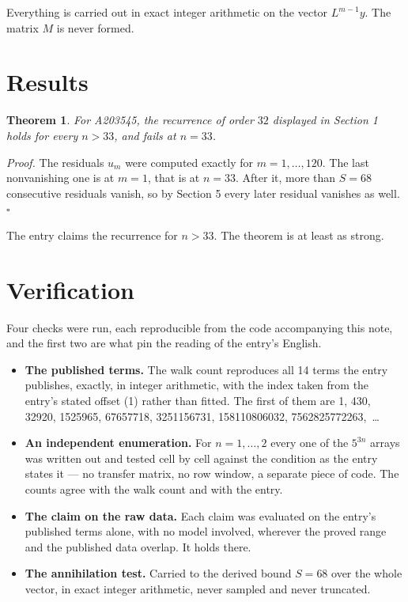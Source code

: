 \documentclass[11pt]{article}
\newtheorem{theorem}{Theorem}
\theoremstyle{definition}
\begin{document}
Everything is carried out in exact integer arithmetic on the vector $L^{m-1}y$. The matrix $M$ is never formed.

\section{Results}

\begin{theorem} For A203545, the recurrence of order $32$ displayed in Section 1 holds for every $n > 33$, and fails at $n = 33$.\end{theorem}

{\itshape Proof.} The residuals $u_m$ were computed exactly for $m = 1,\dots,120$. The last nonvanishing one is at $m = 1$, that is at $n = 33$. After it, more than $S = 68$ consecutive residuals vanish, so by Section 5 every later residual vanishes as well. $\square$

The entry claims the recurrence for $n > 33$. The theorem is at least as strong.

\section{Verification}

Four checks were run, each reproducible from the code accompanying this note, and the first two are what pin the reading of the entry's English.

\begin{itemize}

\item {\bfseries The published terms.} The walk count reproduces all 14 terms the entry publishes, exactly, in integer arithmetic, with the index taken from the entry's stated offset (1) rather than fitted. The first of them are 1, 430, 32920, 1525965, 67657718, 3251156731, 158110806032, 7562825772263,~\dots

\item {\bfseries An independent enumeration.} For $n = 1,\dots,2$ every one of the $5^{3n}$ arrays was written out and tested cell by cell against the condition as the entry states it --- no transfer matrix, no row window, a separate piece of code. The counts agree with the walk count and with the entry.

\item {\bfseries The claim on the raw data.} Each claim was evaluated on the entry's published terms alone, with no model involved, wherever the proved range and the published data overlap. It holds there.

\item {\bfseries The annihilation test.} Carried to the derived bound $S = 68$ over the whole vector, in exact integer arithmetic, never sampled and never truncated.

\end{itemize}
\end{document}
